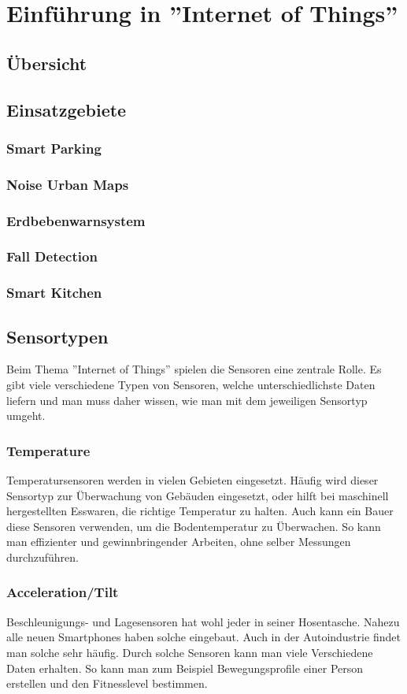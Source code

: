 \chapter{Einführung in ''Internet of Things''}
\section{Übersicht}
\section{Einsatzgebiete}
\subsection{Smart Parking}
\subsection{Noise Urban Maps}
\subsection{Erdbebenwarnsystem}
\subsection{Fall Detection}
\subsection{Smart Kitchen}
\section{Sensortypen}
Beim Thema ''Internet of Things'' spielen die Sensoren eine zentrale Rolle. Es gibt viele verschiedene Typen von Sensoren, welche unterschiedlichste Daten liefern und man muss daher wissen, wie man mit dem jeweiligen Sensortyp umgeht. 
\subsection{Temperature}
Temperatursensoren werden in vielen Gebieten eingesetzt. Häufig wird dieser Sensortyp zur Überwachung von Gebäuden eingesetzt, oder hilft bei maschinell hergestellten Esswaren, die richtige Temperatur zu halten. Auch kann ein Bauer diese Sensoren verwenden, um die Bodentemperatur zu Überwachen. So kann man effizienter und gewinnbringender Arbeiten, ohne selber Messungen durchzuführen. 
\subsection{Acceleration/Tilt}
Beschleunigungs- und Lagesensoren hat wohl jeder in seiner Hosentasche. Nahezu alle neuen Smartphones haben solche eingebaut. Auch in der Autoindustrie findet man solche sehr häufig. Durch solche Sensoren kann man viele Verschiedene Daten erhalten. So kann man zum Beispiel Bewegungsprofile einer Person erstellen und den Fitnesslevel bestimmen.

